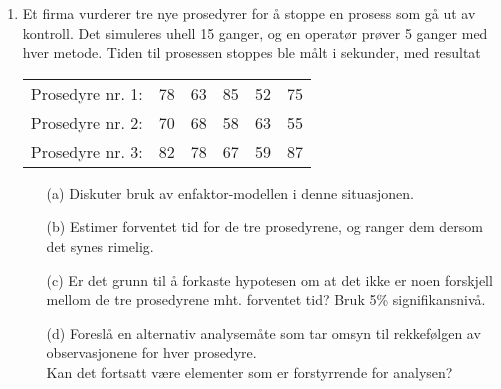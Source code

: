 \begin{enumerate}
\item
Et firma vurderer tre nye prosedyrer for å stoppe en prosess som gå
ut av kontroll. Det simuleres uhell 15 ganger, og en operatør prøver 5
 ganger med hver metode. Tiden til prosessen stoppes ble målt i sekunder,
med resultat
\begin{center}
\begin{tabular}{cccccc}
   Prosedyre nr. 1:  &  78  &  63  &  85  &  52  &  75 \\
   Prosedyre nr. 2:  &  70  &  68  &  58  &  63  &  55 \\
   Prosedyre nr. 3:  &  82  &  78  &  67  &  59  &  87 
\end{tabular}
\end{center}
\begin{itemize}
\item[(a)] Diskuter bruk av enfaktor-modellen i denne situasjonen.
\item[(b)] Estimer forventet tid for de tre prosedyrene, og ranger dem
         dersom det synes rimelig.
\item[(c)] Er det grunn til å forkaste hypotesen om at det ikke er
           noen forskjell mellom de tre prosedyrene mht. forventet tid?
             Bruk 5\% signifikansnivå.
\item[(d)] Foreslå en alternativ analysemåte som tar omsyn til
           rekkefølgen av observasjonene for hver prosedyre. \\
           Kan det fortsatt være elementer som er forstyrrende for
           analysen?
\end{itemize}


\end{enumerate}
